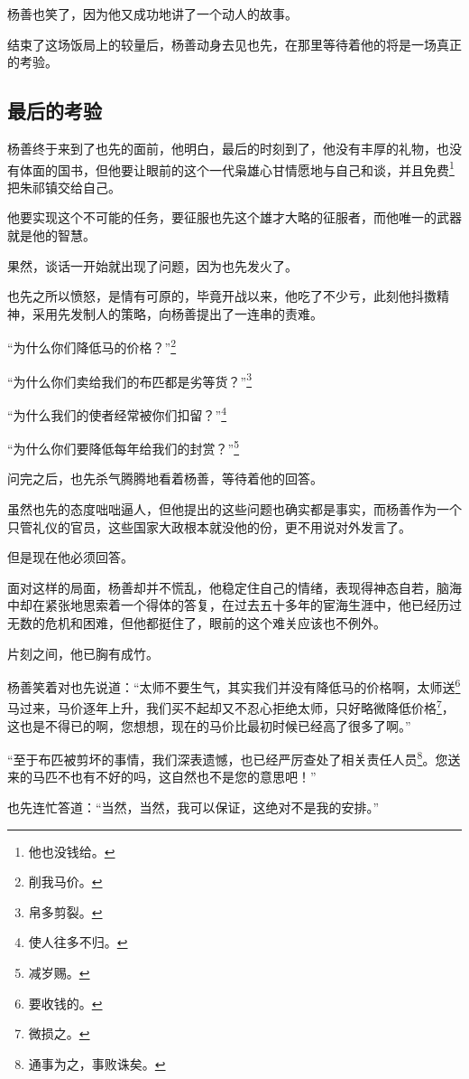 \begin{multicols}{\theparacolNo}
杨善也笑了，因为他又成功地讲了一个动人的故事。

结束了这场饭局上的较量后，杨善动身去见也先，在那里等待着他的将是一场真正的考验。

\subsection{最后的考验}
杨善终于来到了也先的面前，他明白，最后的时刻到了，他没有丰厚的礼物，也没有体面的国书，但他要让眼前的这个一代枭雄心甘情愿地与自己和谈，并且免费\footnote{他也没钱给。}把朱祁镇交给自己。

他要实现这个不可能的任务，要征服也先这个雄才大略的征服者，而他唯一的武器就是他的智慧。

果然，谈话一开始就出现了问题，因为也先发火了。

也先之所以愤怒，是情有可原的，毕竟开战以来，他吃了不少亏，此刻他抖擞精神，采用先发制人的策略，向杨善提出了一连串的责难。

“为什么你们降低马的价格？”\footnote{削我马价。}

“为什么你们卖给我们的布匹都是劣等货？”\footnote{帛多剪裂。}

“为什么我们的使者经常被你们扣留？”\footnote{使人往多不归。}

“为什么你们要降低每年给我们的封赏？”\footnote{减岁赐。}

问完之后，也先杀气腾腾地看着杨善，等待着他的回答。

虽然也先的态度咄咄逼人，但他提出的这些问题也确实都是事实，而杨善作为一个只管礼仪的官员，这些国家大政根本就没他的份，更不用说对外发言了。

但是现在他必须回答。

面对这样的局面，杨善却并不慌乱，他稳定住自己的情绪，表现得神态自若，脑海中却在紧张地思索着一个得体的答复，在过去五十多年的宦海生涯中，他已经历过无数的危机和困难，但他都挺住了，眼前的这个难关应该也不例外。

片刻之间，他已胸有成竹。

杨善笑着对也先说道：“太师不要生气，其实我们并没有降低马的价格啊，太师送\footnote{要收钱的。}马过来，马价逐年上升，我们买不起却又不忍心拒绝太师，只好略微降低价格\footnote{微损之。}，这也是不得已的啊，您想想，现在的马价比最初时候已经高了很多了啊。”

“至于布匹被剪坏的事情，我们深表遗憾，也已经严厉查处了相关责任人员\footnote{通事为之，事败诛矣。}。您送来的马匹不也有不好的吗，这自然也不是您的意思吧！”

也先连忙答道：“当然，当然，我可以保证，这绝对不是我的安排。”


\end{multicols}
